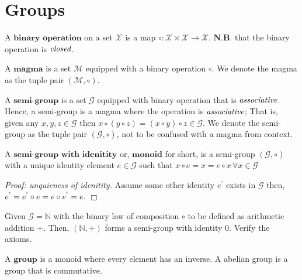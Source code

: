 \section{Groups} %
\label{sec:groups}

\begin{defn}
 A $\textbf{binary operation}$ on a set $\mathcal{X}$ is a map
 $\circ : \mathcal{X} \times \mathcal{X} \to \mathcal{X}$.
 $\textbf{N.B.}$ that the binary operation is $\emph{closed}$.
\end{defn}

\begin{defn}[Magma]
 A $\textbf{magma}$ is a set $\mathcal{M}$ equipped with a binary operation $\circ$.
 We denote the magma as the tuple pair $(\mathcal{M}, \circ)$.
\end{defn}


\begin{defn}
 A $\textbf{semi-group}$ is a set $\mathcal{G}$ equipped with binary operation that is $\emph{associative}$.
 Hence, a semi-group is a magma where the operation is $\emph{associative}$;
 That is, given any $x,y,z \in \mathcal{G}$ then $x \circ (y \circ z) = (x \circ y) \circ z \in \mathcal{G}$.
 We denote the semi-group as the tuple pair $(\mathcal{G}, \circ)$, not to be confused with a magma from context.
\end{defn}

\begin{defn}[Monoid]
 A $\textbf{semi-group with idenitity}$ or, $\textbf{monoid}$ for short, is a semi-group $(\mathcal{G}, \circ)$
 with a unique identity element $e \in \mathcal{G}$ such that $x \circ e = x = e \circ x \, \forall x \in \mathcal{G}$
\end{defn}


\begin{proof}[Proof: unquieness of idenitity]
 Assume some other identity $e^{'}$ exists in $\mathcal{G}$ then, $e^{'} = e^{'} \circ e = e \circ e^{'} = e. \qedhere$
\end{proof}


\begin{exmp}
 Given $\mathcal{G} = \mathbb{N}$ with the binary law of composition $\circ$ to be defined as arithmetic addition $+$.
 Then, $(\mathbb{N}, +)$ forms a semi-group with identity $0$. Verify the axioms.
\end{exmp}


\begin{defn}[Group]
 A $\textbf{group}$ is a monoid where every element has an inverse. A abelian group is a group that is commutative.
\end{defn}


